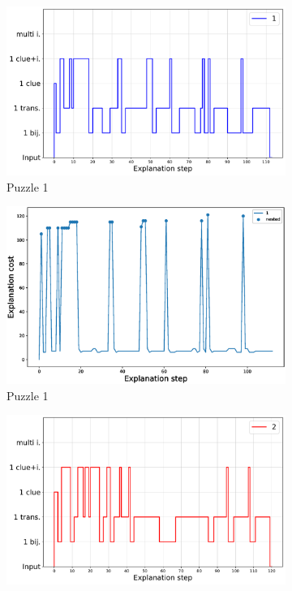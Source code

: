 \begin{figure}[t!]
	\centering
	\begin{subfigure}{.5\textwidth}
		\centering
		\includegraphics[width=0.9\linewidth]{figures/plot_cost_steps_1.pdf}
		\caption{Puzzle 1}
		\label{fig:composition_puzzle:p1}
	\end{subfigure}%
	\begin{subfigure}{.5\textwidth}
		\centering
		\includegraphics[width=0.84\linewidth]{figures/1.eps}
		\caption{Puzzle 1}
		\label{fig:cost_puzzle:p1}
	\end{subfigure}
	\begin{subfigure}{.5\textwidth}
		\centering
		\includegraphics[width=0.9\linewidth]{figures/plot_cost_steps_2.pdf}

\end{subfigure}
\end{figure}
